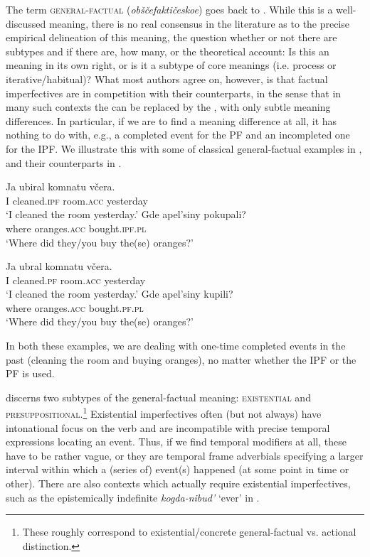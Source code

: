 \documentclass[output=paper,modfonts,newtxmath,hidelinks
\ChapterDOI{10.5281/zenodo.2545513}
]{langscibook}
\begin{document}
The term \textsc{general-factual} (\textit{obščefaktičeskoe}) goes back to \citet{maslov59} \citep[for recent discussion see][]{mehlig16}. While this is a well-discussed  meaning, there is no real consensus in the literature \citep[see][chapter 4 for an overview and references]{gronndiss} as to the precise empirical delineation of this meaning, the question whether or not there are subtypes and if there are, how many, or the theoretical account: Is this an  meaning in its own right, or is it a subtype of core  meanings (i.e. process or iterative/habitual)? What most authors agree on, however, is that factual imperfectives are in  competition with their  counterparts, in the sense that in many such contexts the  can be replaced by the , with only subtle meaning differences. In particular, if we are to find a meaning difference at all, it has nothing to do with, e.g., a completed event for the PF and an incompleted one for the IPF. We illustrate this with some of  classical general-factual examples in , and their  counterparts in . 

\ea\label{oranges}
\ea\gll Ja ubiral komnatu včera.\\
       I cleaned.\textsc{ipf} room.\textsc{acc} yesterday\\
\glt       `I cleaned the room yesterday.'
\ex\gll Gde apel'siny pokupali?\\
               where oranges.\textsc{acc} bought.\textsc{ipf}.\textsc{pl} \\
\glt               `Where did they/you buy the(se) oranges?'
\z\z

\ea\label{orangesPF}
\ea\gll Ja ubral komnatu včera.\\
       I cleaned.\textsc{pf} room.\textsc{acc} yesterday\\
\glt       `I cleaned the room yesterday.'
\ex\gll Gde apel'siny kupili?\\
     where oranges.\textsc{acc} bought.\textsc{pf}.\textsc{pl}\\
\glt               `Where did they/you buy the(se) oranges?'
\z\z

\noindent In both these examples, we are dealing with one-time completed events in the past (cleaning the room and buying oranges), no matter whether the IPF or the PF is used.

\citet{gronndiss} discerns two subtypes of the general-factual meaning: \textsc{existential} and \textsc{presuppositional}.\footnote{These roughly correspond to  existential/concrete general-factual vs. actional distinction.} Existential imperfectives often (but not always) have intonational focus on the verb and are incompatible with precise temporal expressions locating an event. Thus, if we find temporal modifiers at all, these have to be rather vague, or they are temporal frame adverbials specifying a larger interval within which a (series of) event(s) happened (at some point in time or other). There are also contexts which actually require existential imperfectives, such as the epistemically indefinite \textit{kogda-nibud'} `ever' in .
\end{document}
